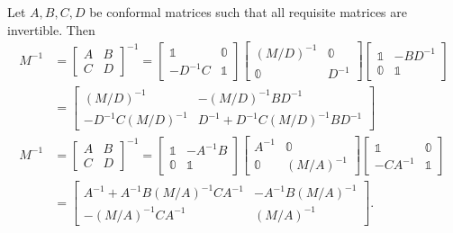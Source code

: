 \begin{lemma}
Let $A,B,C,D$ be conformal matrices such that all requisite matrices are invertible. Then
\begin{align*}
M^{-1} &= \begin{bmatrix}
A & B \\ C & D
\end{bmatrix}^{-1} = \begin{bmatrix}
\mathbb{1} & \mathbb{0} \\ -D^{-1}C & \mathbb{1}
\end{bmatrix}\begin{bmatrix}
(M/D)^{-1} & \mathbb{0} \\ \mathbb{0} & D^{-1}
\end{bmatrix}\begin{bmatrix}
\mathbb{1} & -BD^{-1} \\ \mathbb{0} & \mathbb{1}
\end{bmatrix} \\
&= \begin{bmatrix}
(M/D)^{-1} & -(M/D)^{-1}BD^{-1} \\ -D^{-1}C(M/D)^{-1} & D^{-1}+D^{-1}C(M/D)^{-1}BD^{-1}\end{bmatrix} \\
M^{-1} &= \begin{bmatrix}
A & B \\ C & D
\end{bmatrix}^{-1} = \begin{bmatrix}
\mathbb{1} & -A^{-1}B \\ \mathbb{0} & \mathbb{1}
\end{bmatrix}\begin{bmatrix}
A^{-1} & \mathbb{0} \\ \mathbb{0} & (M/A)^{-1}
\end{bmatrix}\begin{bmatrix}
\mathbb{1} & \mathbb{0} \\ -CA^{-1} & \mathbb{1}
\end{bmatrix} \\
&= \begin{bmatrix}
A^{-1}+A^{-1}B(M/A)^{-1}CA^{-1} & -A^{-1}B(M/A)^{-1} \\-(M/A)^{-1}CA^{-1} & (M/A)^{-1}
\end{bmatrix}.
\end{align*}
\end{lemma}

